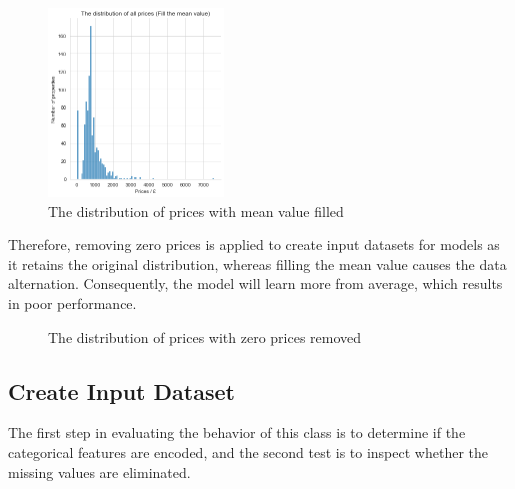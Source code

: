 \documentclass[12pt,twoside]{report}
\begin{document}
\begin{figure}[!htbp]
	\centering
	\includegraphics[height=5cm]{price_all_mean}
	\caption{The distribution of prices with mean value filled}
	\label{price_filled}
\end{figure}

Therefore, removing zero prices is applied to create input datasets for models as it retains the original distribution, whereas filling the mean value causes the data alternation. Consequently, the model will learn more from average, which results in poor performance. 

\begin{figure}[h]
	\centering
	\hfil
	\caption{The distribution of prices with zero prices removed}
	\label{price_removed}
\end{figure}

\subsection{Create Input Dataset}
The first step in evaluating the behavior of this class is to determine if the categorical features are encoded, and the second test is to inspect whether the missing values are eliminated.
\\
\end{document}
